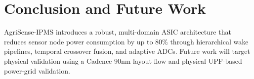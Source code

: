 \documentclass[conference]{IEEEtran}
\begin{document}
\section{Conclusion and Future Work}
AgriSense-IPMS introduces a robust, multi-domain ASIC architecture that reduces sensor node power consumption by up to 80\% through hierarchical wake pipelines, temporal crossover fusion, and adaptive ADCs. Future work will target physical validation using a Cadence 90nm layout flow and physical UPF-based power-grid validation.



\end{document}
